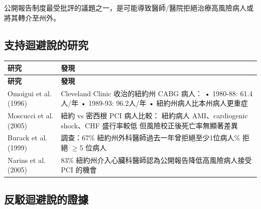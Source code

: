 \documentclass[12pt,a4paper]{article}
\begin{document}
公開報告制度最受批評的議題之一，是可能導致醫師/醫院拒絕治療高風險病人或將其轉介至州外。

\subsection{支持迴避說的研究}

\begin{longtable}{p{3cm}p{11cm}}
\toprule
\textbf{研究} & \textbf{發現} \\
\midrule
\endfirsthead

\toprule
\textbf{研究} & \textbf{發現} \\
\midrule
\endhead

\bottomrule
\endfoot

Omoigui et al. (1996) & Cleveland Clinic 收治的紐約州 CABG 病人：\newline
• 1980-88: 61.4人/年\newline
• 1989-93: 96.2人/年\newline
• 紐約州病人比本州病人更重症 \\
\midrule
Moscucci et al. (2005) & 紐約 vs 密西根 PCI 病人比較：\newline
紐約病人 AMI、cardiogenic shock、CHF 盛行率較低\newline
但風險校正後死亡率無顯著差異 \\
\midrule
Burack et al. (1999) & 調查：67\% 紐約州外科醫師過去一年曾拒絕至少1位病人\newline
18\% 拒絕 $\geq$5 位病人 \\
\midrule
Narins et al. (2005) & 83\% 紐約州介入心臟科醫師認為公開報告降低高風險病人接受 PCI 的機會 \\
\bottomrule
\end{longtable}

\subsection{反駁迴避說的證據}
\end{document}
